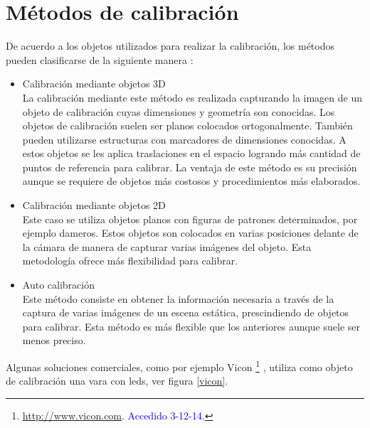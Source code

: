 \section{Métodos de calibración}

De acuerdo a los objetos utilizados para realizar la calibración, los métodos pueden clasificarse de la siguiente manera \cite{zhang_libro}:\\

\begin{itemize}
\item Calibración mediante objetos 3D\\

La calibración mediante este método es realizada capturando la imagen de un objeto de calibración cuyas dimensiones y geometría son conocidas. Los objetos de calibración suelen ser planos colocados ortogonalmente. También pueden utilizarse estructuras con marcadores de dimensiones conocidas. A estos objetos se les aplica traslaciones en el espacio logrando más cantidad de puntos de referencia para calibrar. La ventaja de este método es su precisión aunque se requiere de objetos más costosos y procedimientos más elaborados.\\

\item Calibración mediante objetos 2D\\

Este caso se utiliza objetos planos con figuras de patrones determinados, por ejemplo dameros. Estos objetos son colocados en varias posiciones delante de la cámara de manera de capturar varias imágenes del objeto. Esta metodología ofrece más flexibilidad para calibrar.\\

\item Auto calibración\\

Este método consiste en obtener la información necesaria a través de la captura de varias imágenes de un escena estática, prescindiendo de objetos para calibrar. Esta método es más flexible que  los anteriores aunque suele ser menos preciso.\\

\end{itemize}


Algunas soluciones comerciales, como por ejemplo Vicon \footnote{\textcolor{blue}{\underline{\url{http://www.vicon.com}}. Accedido 3-12-14.}} , utiliza como objeto de calibración una vara con leds, ver figura \ref{vicon}. 

